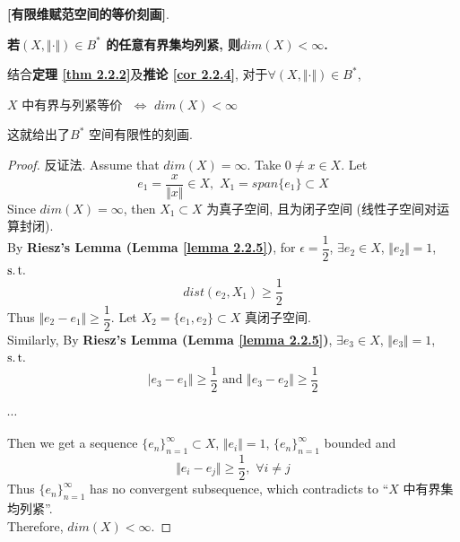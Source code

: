 	\begin{thm}\label{thm 2.2.6}
		\textbf{[有限维赋范空间的等价刻画]}. 
		\begin{center}
			\textbf{若$(X , \Vert \cdot \Vert) \in B^*$ 的任意有界集均列紧, 则$dim(X) < \infty$.}
		\end{center}
		
		\vspace{2em}
		
		\begin{rmk}
			结合\textbf{定理 \ref{thm 2.2.2}}及\textbf{推论 \ref{cor 2.2.4}}, 对于$\forall (X , \Vert \cdot \Vert) \in B^*$, 
			\begin{center}
				$X$ 中有界与列紧等价 $\,\, \Leftrightarrow \,\, dim(X) < \infty$
			\end{center}
			这就给出了$B^*$ 空间有限性的刻画.
		\end{rmk}
		
		\vspace{4em}
		
		\begin{proof}
			反证法. Assume that $dim(X) = \infty$. Take $0 \neq x \in X$. Let 
			\[ e_1 = \dfrac{x}{\Vert x \Vert} \in X , \,\, X_1 = span \{ e_1 \} \subset X \] 
			Since $dim(X) = \infty$, then $X_1 \subset X$ 为真子空间, 且为闭子空间 (线性子空间对运算封闭). \\
			By \textbf{Riesz's Lemma (Lemma \ref{lemma 2.2.5})}, for $\epsilon = \dfrac{1}{2}$, $\exists e_2 \in X$, $\Vert e_2 \Vert = 1$, $\operatorname{s.t.}$
			\[ dist(e_2 , X_1) \geq \frac{1}{2} \]
			Thus $\Vert e_2 - e_1 \Vert \geq \dfrac{1}{2}$. Let $X_2 = \{ e_1 , e_2 \} \subset X$ 真闭子空间. \\
			Similarly, By \textbf{Riesz's Lemma (Lemma \ref{lemma 2.2.5})}, $\exists e_3 \in X$, $\Vert e_3 \Vert = 1$, $\operatorname{s.t.}$
			\[ \vert e_3 - e_1 \Vert \geq \frac{1}{2} \,\, \text{and} \,\, \Vert e_3 - e_2 \Vert \geq \frac{1}{2} \]
			\begin{center}
				$\cdots$
			\end{center}
			Then we get a sequence $\{ e_n \}_{n = 1}^{\infty} \subset X$, $\Vert e_i \Vert = 1$, $\{ e_n \}_{n = 1}^{\infty}$ bounded and 
			\[ \Vert e_i - e_j \Vert \geq \frac{1}{2} , \,\, \forall i \neq j \]
			Thus $\{ e_n \}_{n = 1}^{\infty}$ has no convergent subsequence, which contradicts to “$X$ 中有界集均列紧”. \\
			Therefore, $dim(X) < \infty$.
		\end{proof}
	\end{thm}

\newpage

